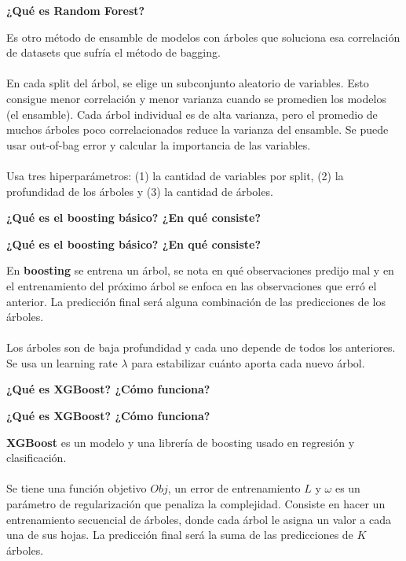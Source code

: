 \documentclass[10pt]{memoir}
\begin{document}
\clearpage
\begin{center}
	\textbf{\Large ¿Qué es Random Forest?} \\
\end{center}
\noindent Es otro método de ensamble de modelos con árboles que soluciona esa correlación de datasets que sufría el método de bagging. \\
\\
En cada split del árbol, se elige un subconjunto aleatorio de variables. Esto consigue menor correlación y menor varianza cuando se promedien los modelos (el ensamble). Cada árbol individual es de alta varianza, pero el promedio de muchos árboles poco correlacionados reduce la varianza del ensamble. Se puede usar out-of-bag error y calcular la importancia de las variables. \\
\\
Usa tres hiperparámetros: (1) la cantidad de variables por split, (2) la profundidad de los árboles y (3) la cantidad de árboles.


\clearpage
\begin{center}
	\textbf{\Large ¿Qué es el boosting básico? ¿En qué consiste?} \\
\end{center}

\clearpage
\begin{center}
	\textbf{\Large ¿Qué es el boosting básico? ¿En qué consiste?} \\
\end{center}
\noindent En \textbf{boosting} se entrena un árbol, se nota en qué observaciones predijo mal y en el entrenamiento del próximo árbol se enfoca en las observaciones que erró el anterior. La predicción final será alguna combinación de las predicciones de los árboles. \\
\\
\noindent Los árboles son de baja profundidad y cada uno depende de todos los anteriores. Se usa un learning rate $\lambda$ para estabilizar cuánto aporta cada nuevo árbol.

\clearpage
\begin{center}
	\textbf{\Large ¿Qué es XGBoost? ¿Cómo funciona?} \\
\end{center}

\clearpage
\begin{center}
	\textbf{\Large ¿Qué es XGBoost? ¿Cómo funciona?} \\
\end{center}
\noindent \textbf{XGBoost} es un modelo y una librería de boosting usado en regresión y clasificación. \\
\\
\noindent Se tiene una función objetivo $Obj$, un error de entrenamiento $L$ y $\omega$ es un parámetro de regularización que penaliza la complejidad. Consiste en hacer un entrenamiento secuencial de árboles, donde cada árbol le asigna un valor a cada una de sus hojas. La predicción final será la suma de las predicciones de $K$ árboles.
\end{document}
